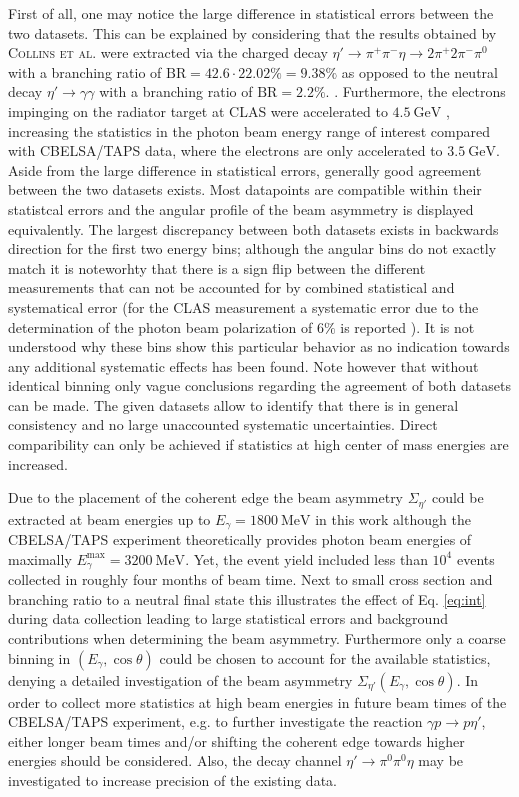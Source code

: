 First of all, one may notice the large difference in statistical errors between the two datasets. This can be explained by considering that the results obtained by \textsc{Collins et al.} \cite{collins} were extracted via the charged decay $\eta'\to\pi^+\pi^-\eta\to2\pi^+2\pi^-\pi^0$ with a branching ratio of $\text{BR}=42.6\cdot22.02\%=9.38\%$ \cite{pdg} as opposed to the neutral decay $\eta'\to\gamma\gamma$ with a branching ratio of $\text{BR}=2.2\%.$ \cite{pdg}. Furthermore, the electrons impinging on the radiator target at CLAS were accelerated to  $\SI{4.5}{\giga\eV}$ \cite{collins}, increasing the statistics in the photon beam energy range of interest compared with CBELSA/TAPS data, where the electrons are only accelerated to  $\SI{3.5}{\giga\eV}$. Aside from the large difference in statistical errors, generally good agreement between the two datasets exists. Most datapoints are compatible within their statistcal errors and the angular profile of the beam asymmetry is displayed equivalently. The largest discrepancy between both datasets exists in backwards direction for the first two energy bins;  although the angular bins do not exactly match it is noteworhty that there is a sign flip between the different measurements that can not be accounted for by combined statistical and systematical error (for the CLAS measurement a systematic error due to the determination of the photon beam polarization of $6\%$ is reported \cite{collins}). It is not understood why these bins show this particular behavior as no indication towards any additional systematic effects has been found. Note however that without identical binning only vague conclusions regarding the agreement of both datasets can be made. The given datasets allow to identify that there is in general consistency and no large unaccounted systematic uncertainties. Direct comparibility can only be achieved if statistics at high center of mass energies are increased. 

Due to the placement of the coherent edge the beam asymmetry $\Sigma_{\eta'}$ could be extracted at beam energies up to $E_\gamma=\SI{1800}{\mega\eV}$ in this work although the CBELSA/TAPS experiment theoretically provides photon beam energies of maximally $E_\gamma^\text{max}=\SI{3200}{\mega\eV}$. Yet, the event yield included less than $10^4$ events collected in roughly four months of beam time. Next to small cross section and branching ratio to a neutral final state this illustrates the effect of Eq. \ref{eq:int} during data collection leading to large statistical errors and background contributions when determining the beam asymmetry. Furthermore only a coarse binning in $\left(E_\gamma,\cos\theta\right)$ could be chosen to account for the available statistics, denying a detailed investigation of the beam asymmetry $\Sigma_{\eta'}\left(E_\gamma,\cos\theta\right)$. In order to collect more statistics at high beam energies in future beam times of the CBELSA/TAPS experiment, e.g. to further investigate the reaction $\gamma p\to p\eta'$, either longer beam times and/or shifting the coherent edge towards higher energies should be considered. Also, the decay channel $\eta'\to\pi^0\pi^0\eta$ may be investigated to increase precision of the existing data.
